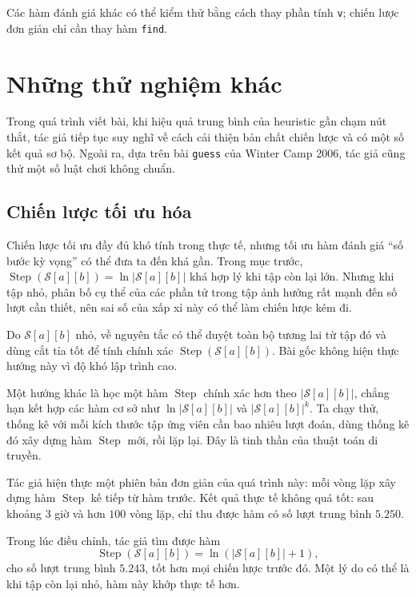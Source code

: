 \documentclass[11pt]{article}
\newcommand{\SetS}{\mathcal{S}}
\begin{document}
Các hàm đánh giá khác có thể kiểm thử bằng cách thay phần tính \texttt{v};
chiến lược đơn giản chỉ cần thay hàm \texttt{find}.

\section{Những thử nghiệm khác}

Trong quá trình viết bài, khi hiệu quả trung bình của heuristic gần chạm nút
thắt, tác giả tiếp tục suy nghĩ về cách cải thiện bản chất chiến lược và có
một số kết quả sơ bộ. Ngoài ra, dựa trên bài \texttt{guess} của Winter Camp
2006, tác giả cũng thử một số luật chơi không chuẩn.

\subsection{Chiến lược tối ưu hóa}

Chiến lược tối ưu đầy đủ khó tính trong thực tế, nhưng tối ưu hàm đánh giá
``số bước kỳ vọng'' có thể đưa ta đến khá gần. Trong mục trước,
\(\operatorname{Step}(\SetS[a][b])=\ln|\SetS[a][b]|\) khá hợp lý khi tập còn
lại lớn. Nhưng khi tập nhỏ, phân bố cụ thể của các phần tử trong tập ảnh hưởng
rất mạnh đến số lượt cần thiết, nên sai số của xấp xỉ này có thể làm chiến
lược kém đi.

Do \(\SetS[a][b]\) nhỏ, về nguyên tắc có thể duyệt toàn bộ tương lai từ tập đó
và dùng cắt tỉa tốt để tính chính xác
\(\operatorname{Step}(\SetS[a][b])\). Bài gốc không hiện thực hướng này vì độ
khó lập trình cao.

Một hướng khác là học một hàm \(\operatorname{Step}\) chính xác hơn theo
\(|\SetS[a][b]|\), chẳng hạn kết hợp các hàm cơ sở như
\(\ln|\SetS[a][b]|\) và \(|\SetS[a][b]|^k\). Ta chạy thử, thống kê với mỗi
kích thước tập ứng viên cần bao nhiêu lượt đoán, dùng thống kê đó xây dựng
hàm \(\operatorname{Step}\) mới, rồi lặp lại. Đây là tinh thần của thuật toán
di truyền.

Tác giả hiện thực một phiên bản đơn giản của quá trình này: mỗi vòng lặp xây
dựng hàm \(\operatorname{Step}\) kế tiếp từ hàm trước. Kết quả thực tế không
quá tốt: sau khoảng \(3\) giờ và hơn \(100\) vòng lặp, chỉ thu được hàm có số
lượt trung bình \(5.250\).

Trong lúc điều chỉnh, tác giả tìm được hàm
\[
  \operatorname{Step}(\SetS[a][b])=\ln(|\SetS[a][b]|+1),
\]
cho số lượt trung bình \(5.243\), tốt hơn mọi chiến lược trước đó. Một lý do
có thể là khi tập còn lại nhỏ, hàm này khớp thực tế hơn.
\end{document}
